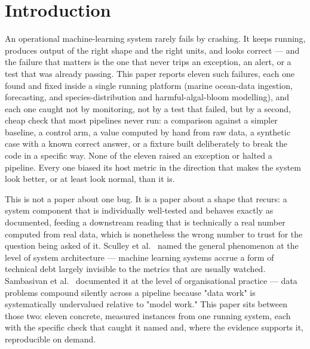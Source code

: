 %

\section{Introduction}

An operational machine-learning system rarely fails by crashing. It keeps
running, produces output of the right shape and the right units, and looks
correct --- and the failure that matters is the one that never trips an
exception, an alert, or a test that was already passing. This paper reports
eleven such failures, each one found and fixed inside a single running
platform (marine ocean-data ingestion, forecasting, and species-distribution
and harmful-algal-bloom modelling), and each one caught not by monitoring,
not by a test that failed, but by a second, cheap check that most pipelines
never run: a comparison against a simpler baseline, a control arm, a value
computed by hand from raw data, a synthetic case with a known correct answer,
or a fixture built deliberately to break the code in a specific way. None of
the eleven raised an exception or halted a pipeline. Every one biased its
host metric in the direction that makes the system look better, or at least
look normal, than it is.

This is not a paper about one bug. It is a paper about a shape that recurs:
a system component that is individually well-tested and behaves exactly as
documented, feeding a downstream reading that is technically a real number
computed from real data, which is nonetheless the wrong number to trust for
the question being asked of it. Sculley et al.~\citep{sculley2015} named the
general phenomenon at the level of system architecture --- machine learning
systems accrue a form of technical debt largely invisible to the metrics
that are usually watched. Sambasivan et al.~\citep{sambasivan2021} documented
it at the level of organisational practice --- data problems compound
silently across a pipeline because "data work" is systematically undervalued
relative to "model work." This paper sits between those two: eleven concrete,
measured instances from one running system, each with the specific check
that caught it named and, where the evidence supports it, reproducible on
demand.

